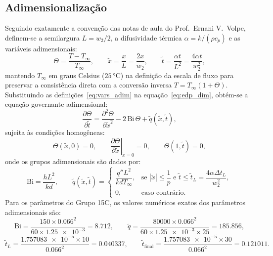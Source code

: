 \documentclass[11pt,a4paper]{article}
\begin{document}
\subsection{Adimensionalização}
Seguindo exatamente a convenção das notas de aula do Prof.~Ernani V.~Volpe, definem-se a semilargura $L = w_2/2$, a difusividade térmica $\alpha = k/(\rho c_p)$ e as variáveis adimensionais:
\begin{equation}
    \Theta = \frac{T - T_\infty}{T_\infty}, \qquad \tilde{x} = \frac{x}{L} = \frac{2x}{w_2}, \qquad \tilde{t} = \frac{\alpha t}{L^2} = \frac{4\alpha t}{w_2^2},
    \label{eq:vars_adim}
\end{equation}
mantendo $T_\infty$ em graus Celsius ($\SI{25}{\celsius}$) na definição da escala de fluxo para preservar a consistência direta com a conversão inversa $T = T_\infty(1 + \Theta)$. Substituindo as definições~\eqref{eq:vars_adim} na equação~\eqref{eq:edp_dim}, obtém-se a equação governante adimensional:
\begin{equation}
    \frac{\partial \Theta}{\partial \tilde{t}} = \frac{\partial^2 \Theta}{\partial \tilde{x}^2} - 2\,\text{Bi}\,\Theta + \tilde{q}(\tilde{x}, \tilde{t}),
    \label{eq:edp_adim}
\end{equation}
sujeita às condições homogêneas:
\begin{equation}
    \Theta(\tilde{x}, 0) = 0, \qquad \left.\frac{\partial \Theta}{\partial \tilde{x}}\right|_{\tilde{x}=0} = 0, \qquad \Theta(1, \tilde{t}) = 0,
    \label{eq:cc_adim}
\end{equation}
onde os grupos adimensionais são dados por:
\begin{equation}
    \text{Bi} = \frac{h L^2}{k d}, \qquad \tilde{q}(\tilde{x}, \tilde{t}) = \begin{cases}
        \dfrac{q'' L^2}{k d T_\infty}, & \text{se } |\tilde{x}| \le \dfrac{1}{p} \text{ e } \tilde{t} \le \tilde{t}_L = \dfrac{4\alpha \Delta t_L}{w_2^2}, \\
        0, & \text{caso contrário.}
    \end{cases}
    \label{eq:grupos_adim}
\end{equation}
Para os parâmetros do Grupo 15C, os valores numéricos exatos dos parâmetros adimensionais são:
\[
    \text{Bi} = \frac{150 \times \num{0,066}^2}{60 \times \num{1,25e-3}} = \num{8,712}, \qquad \tilde{q} = \frac{80000 \times \num{0,066}^2}{60 \times \num{1,25e-3} \times 25} = \num{185,856},
\]
\[
    \tilde{t}_L = \frac{\num{1,757083e-5} \times 10}{\num{0,066}^2} = \num{0,040337}, \qquad \tilde{t}_{\text{final}} = \frac{\num{1,757083e-5} \times 30}{\num{0,066}^2} = \num{0,121011}.
\]
\end{document}
